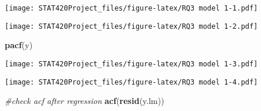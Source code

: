 \documentclass[]{article}
\newenvironment{Shaded}{\begin{snugshade}}{\end{snugshade}}
\newcommand{\CommentTok}[1]{\textcolor[rgb]{0.56,0.35,0.01}{\textit{#1}}}
\newcommand{\DataTypeTok}[1]{\textcolor[rgb]{0.13,0.29,0.53}{#1}}
\newcommand{\KeywordTok}[1]{\textcolor[rgb]{0.13,0.29,0.53}{\textbf{#1}}}
\newcommand{\NormalTok}[1]{#1}
\newcommand{\OperatorTok}[1]{\textcolor[rgb]{0.81,0.36,0.00}{\textbf{#1}}}
\newcommand{\StringTok}[1]{\textcolor[rgb]{0.31,0.60,0.02}{#1}}
\begin{document}
\begin{Shaded}
\end{Shaded}

\texttt{[image: STAT420Project\_files/figure-latex/RQ3 model 1-1.pdf]}

\begin{Shaded}
\end{Shaded}

\texttt{[image: STAT420Project\_files/figure-latex/RQ3 model 1-2.pdf]}

\begin{Shaded}
\begin{Highlighting}[]
\KeywordTok{pacf}\NormalTok{(y)}
\end{Highlighting}
\end{Shaded}

\texttt{[image: STAT420Project\_files/figure-latex/RQ3 model 1-3.pdf]}

\begin{Shaded}
\end{Shaded}

\texttt{[image: STAT420Project\_files/figure-latex/RQ3 model 1-4.pdf]}

\begin{Shaded}
\begin{Highlighting}[]
\CommentTok{#check acf after regression}
\KeywordTok{acf}\NormalTok{(}\KeywordTok{resid}\NormalTok{(y.lm))}
\end{Highlighting}
\end{Shaded}
\end{document}
